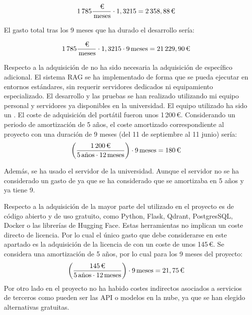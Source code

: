 $$
1\,785\frac{\,\text{\texteuro}}{\,\text{meses}} \cdot 1,3215
= 2\,358,88\,\text{\texteuro}
$$

El gasto total tras los 9 meses que ha durado el desarrollo sería:

$$
1\,785\frac{\,\text{\texteuro}}{\,\text{meses}} \cdot 1,3215 \cdot 9\,\text{meses}
= 21\,229,90\,\text{\texteuro}
$$


Respecto a la adquisición de  no ha sido necesaria la adquisición de  específico adicional. El sistema RAG se ha implementado de forma que se pueda ejecutar en entornos estándares, sin requerir servidores dedicados ni equipamiento especializado. El desarrollo y las pruebas se han realizado utilizando mi equipo personal y servidores ya disponibles en la universidad. El equipo utilizado ha sido un . El coste de adquisición del portátil fueron unos 1\,200\,€. Considerando un periodo de amortización de 5 años, el coste amortizado correspondiente al proyecto con una duración de 9 meses (del 11 de septiembre al 11 junio) sería:
$$
\left(\frac{1\,200\,\text{\texteuro}}{5\,\text{años} \cdot 12\,\text{meses}}\right)\cdot 9\,\text{meses}
= 180\,\text{\texteuro}
$$

Además, se ha usado el servidor  de la universidad. Aunque el servidor no se ha considerado un gasto de  ya que se ha considerado que se amortizaba en 5 años y ya tiene 9.

Respecto a la adquisición de  la mayor parte del  utilizado en el proyecto es de código abierto y de uso gratuito, como Python, Flask, Qdrant, PostgresSQL, Docker o las librerías de Hugging Face. Estas herramientas no implican un coste directo de licencia. Por lo cual el único gasto que debe considerarse en este apartado es la adquisición de la licencia de 
 con un coste de unos 145\,€. Se considera una amortización de 5 años, por lo cual para los 9 meses del proyecto:
$$
\left(\frac{145\,\text{\texteuro}}{5\,\text{años} \cdot 12\,\text{meses}}\right)\cdot 9\,\text{meses}
= 21,75\,\text{\texteuro}
$$
Por otro lado en el proyecto no ha habido costes indirectos asociados a servicios de terceros como pueden ser las API o modelos en la nube, ya que se han elegido alternativas gratuitas.


